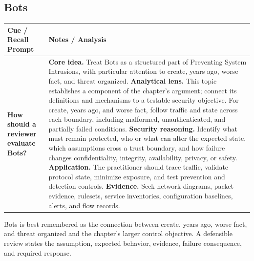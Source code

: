 \documentclass[11pt]{article}
\newcommand{\CornellHeader}{%
\rowcolor{Navy}\color{white}\bfseries Cue / Recall Prompt & \color{white}\bfseries Notes / Analysis\\\hline}
\newcommand{\CornellRow}[2]{%
\cellcolor{CueGray}\RaggedRight\textbf{#1} & \RaggedRight #2\\\hline}
\begin{document}
\subsection*{Bots}
\begin{longtable}{>{\RaggedRight\arraybackslash}p{}|>{\RaggedRight\arraybackslash}p{}}
\CornellHeader
\CornellRow{How should a reviewer evaluate Bots?}{\textbf{Core idea.} Treat Bots as a structured part of Preventing System Intrusions, with particular attention to create, years ago, worse fact, and threat organized. \textbf{Analytical lens.} This topic establishes a component of the chapter's argument; connect its definitions and mechanisms to a testable security objective. For create, years ago, and worse fact, follow traffic and state across each boundary, including malformed, unauthenticated, and partially failed conditions. \textbf{Security reasoning.} Identify what must remain protected, who or what can alter the expected state, which assumptions cross a trust boundary, and how failure changes confidentiality, integrity, availability, privacy, or safety. \textbf{Application.} The practitioner should trace traffic, validate protocol state, minimize exposure, and test prevention and detection controls. \textbf{Evidence.} Seek network diagrams, packet evidence, rulesets, service inventories, configuration baselines, alerts, and flow records.}
\end{longtable}
\begin{topicsummary}
Bots is best remembered as the connection between create, years ago, worse fact, and threat organized and the chapter's larger control objective. A defensible review states the assumption, expected behavior, evidence, failure consequence, and required response.
\end{topicsummary}
\end{document}
